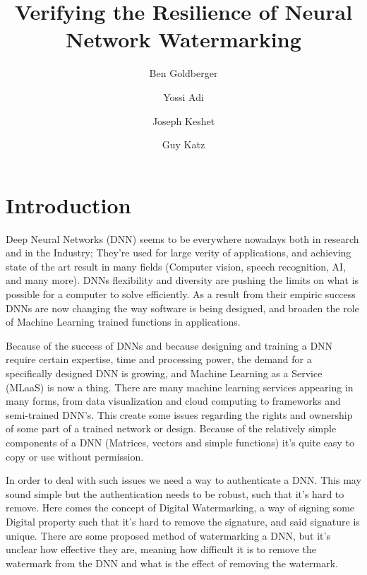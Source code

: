 \documentclass[a4paper]{easychair}
\newcommand{\guy}[1]{\marginpar{\textcolor{orange}{Guy: #1}}}
\begin{document}
\title{Verifying the Resilience of Neural Network Watermarking}

\author{
Ben Goldberger \and
Yossi Adi \and
Joseph Keshet \and
Guy Katz
}

\maketitle

\section{Introduction}


Deep Neural Networks (DNN) seems to be everywhere nowadays both in research and in  the Industry; They're used for large verity of applications, and achieving state of the art result in many fields (Computer vision, speech recognition, AI, and many more). DNNs flexibility and diversity are pushing the limits on what is possible for a computer to solve efficiently. As a result from their empiric success DNNs are now changing the way software is being designed, and broaden the role of Machine Learning trained functions in applications.

Because of the success of DNNs and because designing and training a DNN require certain expertise, time and processing power, the demand for a specifically designed DNN is growing, and Machine Learning as a Service (MLaaS) is now a thing. There are many machine learning services appearing in many forms, from data visualization and cloud computing to frameworks and semi-trained DNN's. This create some issues regarding the rights and ownership of some part of a trained network or design. Because of the relatively simple components of a DNN (Matrices, vectors and simple functions) it's quite easy to copy or use without permission.

\guy{make this more general. people need to make minimal changes to
  DNNs for multiple reasons. Verification can help address this
  need. (Not just watermarks)}

In order to deal with such issues we need a way to authenticate a DNN. This may sound simple but the authentication needs to be robust, such that it's hard to remove. Here comes the concept of Digital Watermarking, a way of signing some Digital property such that it's hard to remove the signature, and said signature is unique. There are some proposed method of watermarking a DNN, but it's unclear how effective they are, meaning how difficult it is to remove the watermark from the DNN and what is the effect of removing the watermark.
\end{document}
